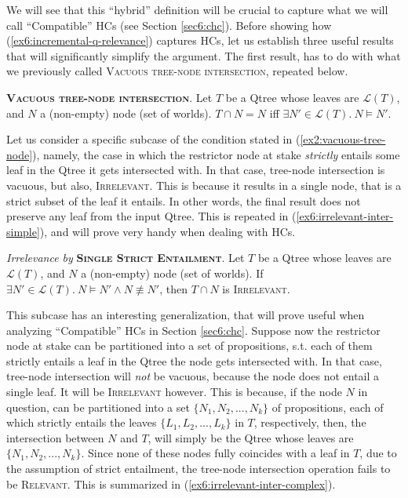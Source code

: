 We will see that this ``hybrid'' definition will be crucial to capture what we will call ``Compatible'' HCs (see Section \ref{sec6:chc}). Before showing how (\ref{ex6:incremental-q-relevance}) captures HCs, let us establish three useful results that will significantly simplify the argument. The first result, has to do with what we previously called \textsc{Vacuous tree-node intersection}, repeated below.

\begin{exe}
	 {\textsc{\textbf{Vacuous tree-node intersection}}. Let $T$ be a Qtree whose leaves are $\mathcal{L}(T)$, and $N$ a (non-empty) node (set of worlds). $T\cap N = N$ iff $\exists N' \in \mathcal{L}(T). \ N \vDash N'$.}
\end{exe}

Let us consider a specific subcase of the condition stated in (\ref{ex2:vacuous-tree-node}), namely, the case in which the restrictor node at stake \textit{strictly} entails some leaf in the Qtree it gets intersected with. In that case, tree-node intersection is vacuous, but also, \textsc{Irrelevant}. This is because it results in a single node, that is a strict subset of the leaf it entails. In other words, the final result does not preserve any leaf from the input Qtree. This is repeated in (\ref{ex6:irrelevant-inter-simple}), and will prove very handy when dealing with HCs.

\begin{exe}
	\ex\label{ex6:irrelevant-inter-simple} {\textit{Irrelevance by} \textsc{\textbf{Single Strict Entailment}}. Let $T$ be a Qtree whose leaves are $\mathcal{L}(T)$, and $N$ a (non-empty) node (set of worlds). If $\exists N' \in \mathcal{L}(T). \ N \vDash N' \wedge N \not\equiv N'$, then $T\cap N$ is \textsc{Irrelevant}.}
\end{exe}

This subcase has an interesting generalization, that will prove useful when analyzing ``Compatible'' HCs in Section \ref{sec6:chc}. Suppose now the restrictor node at stake can be partitioned into a set of propositions, s.t. each of them strictly entails a leaf in the Qtree the node gets intersected with. In that case, tree-node intersection will \textit{not} be vacuous, because the node does not entail a single leaf. It will be \textsc{Irrelevant} however. This is because, if the node $N$ in question, can be partitioned into a set $\lbrace N_1, N_2, ..., N_k\rbrace$ of propositions, each of which strictly entails the leaves $\lbrace L_1, L_2, ..., L_k\rbrace$ in $T$, respectively, then, the intersection between $N$ and $T$, will simply be the Qtree whose leaves are $\lbrace N_1, N_2, ..., N_k\rbrace$. Since none of these nodes fully coincides with a leaf in $T$, due to the assumption of strict entailment, the tree-node intersection operation fails to be \textsc{Relevant}. This is summarized in (\ref{ex6:irrelevant-inter-complex}).

